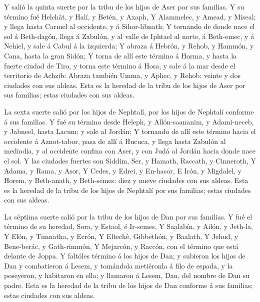  Y salió la quinta suerte por la tribu de los hijos de Aser
por sus familias.  Y su término fué Helchât, y Halí, y
Betén, y Axaph,  Y Alammelec, y Amead, y Miseal; y llega
hasta Carmel al occidente, y á Sihor-libnath;  Y tornando
de donde nace el sol á Beth-dagón, llega á Zabulón, y al valle de
Iphtael al norte, á Beth-emec, y á Nehiel, y sale á Cabul á la
izquierda;  Y abraza á Hebrón, y Rehob, y Hammón, y Cana,
hasta la gran Sidón;  Y torna de allí este término á Horma,
y hasta la fuerte ciudad de Tiro, y torna este término á Hosa, y sale á
la mar desde el territorio de Achzib:  Abraza también Umma,
y Aphec, y Rehob: veinte y dos ciudades con sus aldeas. 
Esta es la heredad de la tribu de los hijos de Aser por sus familias;
estas ciudades con sus aldeas.

 La sexta suerte salió por los hijos de Nephtalí, por los
hijos de Nephtalí conforme á sus familias.  Y fué su
término desde Heleph, y Allón-saananim, y Adami-neceb, y Jabneel, hasta
Lacum; y sale al Jordán;  Y tornando de allí este término
hacia el occidente á Aznot-tabor, pasa de allí á Hucuca, y llega hasta
Zabulón al mediodía, y al occidente confina con Aser, y con Judá al
Jordán hacia donde nace el sol.  Y las ciudades fuertes son
Siddim, Ser, y Hamath, Raccath, y Cinneroth,  Y Adama, y
Rama, y Asor,  Y Cedes, y Edrei, y En-hasor, 
E Irón, y Migdalel, y Horem, y Beth-anath, y Beth-semes: diez y nueve
ciudades con sus aldeas.  Esta es la heredad de la tribu de
los hijos de Nephtalí por sus familias; estas ciudades con sus aldeas.

 La séptima suerte salió por la tribu de los hijos de Dan
por sus familias.  Y fué el término de su heredad, Sora, y
Estaol, é Ir-semes,  Y Saalabín, y Ailón, y Jeth-la,
 Y Elón, y Timnatha, y Ecrón,  Y Eltechê,
Gibbethón, y Baalath,  Y Jehud, y Bene-berác, y
Gath-rimmón,  Y Mejarcón, y Raccón, con el término que está
delante de Joppa.  Y faltóles término á los hijos de Dan; y
subieron los hijos de Dan y combatieron á Lesem, y tomándola metiéronla
á filo de espada, y la poseyeron, y habitaron en ella; y llamaron á
Lesem, Dan, del nombre de Dan su padre.  Esta es la heredad
de la tribu de los hijos de Dan conforme á sus familias; estas ciudades
con sus aldeas.

